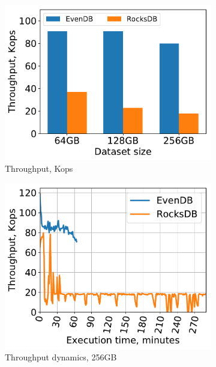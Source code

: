 \begin{figure}[tb]
\centering
\begin{subfigure}{0.33\linewidth}
\includegraphics[width=\textwidth]{figs/ingestion.pdf}
\caption{Throughput, Kops}
\label{fig:prod:ingestion:a}
\end{subfigure}
\begin{subfigure}{0.33\linewidth}
\includegraphics[width=\textwidth]{figs/throughput_256_ingestions_line.pdf}
\caption{Throughput dynamics, 256GB}
\label{fig:prod:ingestion:b}
\end{subfigure}
\begin{subfigure}{0.33\linewidth}

\end{subfigure}
\end{figure}
